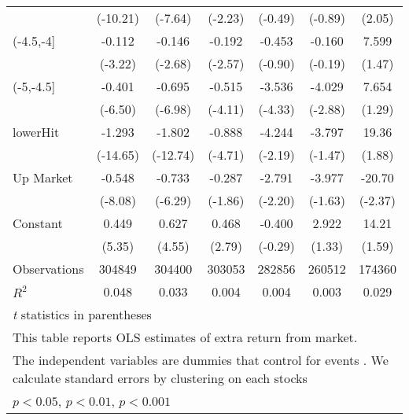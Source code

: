 {\begin{tabular}{l*{6}{c}}
                    &    (-10.21)         &     (-7.64)         &     (-2.23)         &     (-0.49)         &     (-0.89)         &      (2.05)         \\
[1em]
(-4.5,-4]           &      -0.112\sym{**} &      -0.146\sym{**} &      -0.192\sym{*}  &      -0.453         &      -0.160         &       7.599         \\
                    &     (-3.22)         &     (-2.68)         &     (-2.57)         &     (-0.90)         &     (-0.19)         &      (1.47)         \\
[1em]
(-5,-4.5]           &      -0.401\sym{***}&      -0.695\sym{***}&      -0.515\sym{***}&      -3.536\sym{***}&      -4.029\sym{**} &       7.654         \\
                    &     (-6.50)         &     (-6.98)         &     (-4.11)         &     (-4.33)         &     (-2.88)         &      (1.29)         \\
[1em]
lowerHit            &      -1.293\sym{***}&      -1.802\sym{***}&      -0.888\sym{***}&      -4.244\sym{*}  &      -3.797         &       19.36         \\
                    &    (-14.65)         &    (-12.74)         &     (-4.71)         &     (-2.19)         &     (-1.47)         &      (1.88)         \\
[1em]
Up Market           &      -0.548\sym{***}&      -0.733\sym{***}&      -0.287         &      -2.791\sym{*}  &      -3.977         &      -20.70\sym{*}  \\
                    &     (-8.08)         &     (-6.29)         &     (-1.86)         &     (-2.20)         &     (-1.63)         &     (-2.37)         \\
[1em]
Constant            &       0.449\sym{***}&       0.627\sym{***}&       0.468\sym{**} &      -0.400         &       2.922         &       14.21         \\
                    &      (5.35)         &      (4.55)         &      (2.79)         &     (-0.29)         &      (1.33)         &      (1.59)         \\
\hline
Observations        &      304849         &      304400         &      303053         &      282856         &      260512         &      174360         \\
\(R^{2}\)           &       0.048         &       0.033         &       0.004         &       0.004         &       0.003         &       0.029         \\
\hline\hline
\multicolumn{7}{l}{\footnotesize \textit{t} statistics in parentheses}\\
\multicolumn{7}{l}{\footnotesize This table reports OLS estimates of extra return from market.}\\
\multicolumn{7}{l}{\footnotesize The independent variables are dummies that control for events . We calculate standard errors by clustering on each stocks}\\
\multicolumn{7}{l}{\footnotesize \sym{*} \(p<0.05\), \sym{**} \(p<0.01\), \sym{***} \(p<0.001\)}\\
\end{tabular}
}
